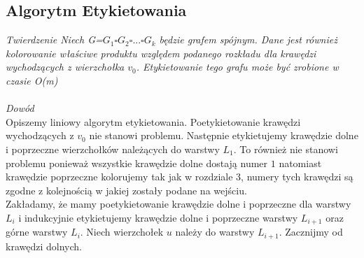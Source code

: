 \documentclass[12pt,a4paper,titlepage]{article}
\begin{document}
\subsection{Algorytm Etykietowania}
\textit{Twierdzenie Niech G=$G_1 \square G_2 \square ... \square G_k$ będzie grafem spójnym. Dane jest również kolorowanie właściwe produktu względem podanego rozkładu dla krawędzi wychodzących z wierzchołka $v_0$. Etykietowanie tego grafu może być zrobione w czasie O(m)}\\
\\
\textit{Dowód}\\
Opiszemy liniowy algorytm etykietowania. Poetykietowanie krawędzi wychodzących z $v_0$ nie stanowi problemu. Następnie etykietujemy krawędzie dolne i poprzeczne wierzchołków należących do warstwy $L_1$. To również nie stanowi problemu ponieważ wszystkie krawędzie dolne dostają numer $1$ natomiast krawędzie poprzeczne kolorujemy tak jak w rozdziale 3, numery tych krawędzi są zgodne z kolejnością w jakiej zostały podane na wejściu. \\
Zakładamy, że mamy poetykietowanie krawędzie dolne i poprzeczne dla warstwy $L_i$ i indukcyjnie etykietujemy krawędzie dolne i poprzeczne warstwy $L_{i+1}$ oraz górne warstwy $L_i$. Niech wierzchołek $u$ należy do warstwy $L_{i+1}$. Zacznijmy od krawędzi dolnych. \\
\end{document}
